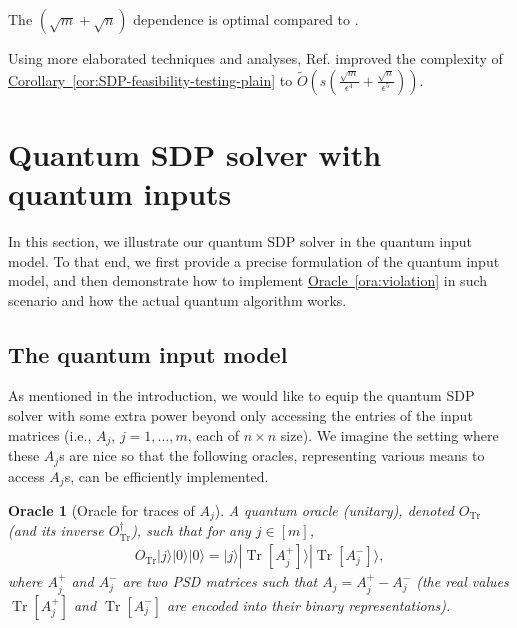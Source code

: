 \documentclass[a4paper,UKenglish,cleveref, autoref]{lipics-v2019}
\newtheorem{oracle}{Oracle}
\theoremstyle{remark}
\numberwithin{equation}{section}
\numberwithin{oracle}{section}
\numberwithin{remark}{section}
\newcommand{\ora}[1]{\hyperref[ora:#1]{Oracle~\ref*{ora:#1}}}
\newcommand{\cor}[1]{\hyperref[cor:#1]{Corollary~\ref*{cor:#1}}}
\def\>{\rangle}
\newcommand{\range}[1]{[#1]}
\DeclareMathOperator{\Tr}{Tr}
\begin{document}
\begin{remark}
The $(\sqrt{m}+\sqrt{n})$ dependence is optimal compared to \cite{brandao2016quantum,vanApeldoorn2017quantum}.
\end{remark}

\begin{remark}
Using more elaborated techniques and analyses, Ref. \cite{vAG18} improved the complexity of \cor{SDP-feasibility-testing-plain} to $\tilde{O}(s(\frac{\sqrt{m}}{\epsilon^{4}}+\frac{\sqrt{n}}{\epsilon^{5}}))$.
\end{remark}



\section{Quantum SDP solver with quantum inputs} \label{append:SDP-efficient}
In this section, we illustrate our quantum SDP solver in the quantum input model. To that end, we first provide a precise formulation of the quantum input model, and then demonstrate how to implement \ora{violation} in such scenario and how the actual quantum algorithm works.

\subsection{The quantum input model}
As mentioned in the introduction, we would like to equip the quantum SDP solver with some extra power beyond only accessing the entries of the input matrices (i.e., $A_j$, $j=1,\ldots,m$, each of $n\times n$ size). We imagine the setting where these $A_j$s are nice so that the following oracles, representing various means to access $A_j$s, can be efficiently implemented.

\begin{oracle}[Oracle for traces of $A_{j}$] \label{ora:trace}
A quantum oracle (unitary), denoted $O_{\Tr}$ (and its inverse $O_{\Tr}^{\dagger}$), such that for any $j\in\range{m}$,
\begin{align}
O_{\Tr}|j\>|0\>|0\>=|j\>|\Tr[A_{j}^{+}]\>|\Tr[A_{j}^{-}]\>,
\end{align}
where $A_{j}^{+}$ and $A_{j}^{-}$ are two PSD matrices such that $A_{j}=A_{j}^{+}-A_{j}^{-}$ (the real values $\Tr[A_{j}^{+}]$ and $\Tr[A_{j}^{-}]$ are encoded into their binary representations).
\end{oracle}
\end{document}
